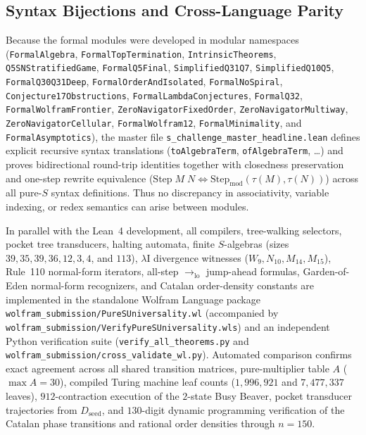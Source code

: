 \documentclass[11pt,reqno]{amsart}
\numberwithin{equation}{section}
\theoremstyle{plain}
\theoremstyle{definition}
\theoremstyle{remark}
\begin{document}
\subsection{Syntax Bijections and Cross-Language Parity}
\label{subsec:cross-language}

Because the formal modules were developed in modular namespaces (\texttt{FormalAlgebra}, \texttt{FormalTopTermination}, \texttt{IntrinsicTheorems}, \texttt{Q5SNStratifiedGame}, \texttt{FormalQ5Final}, \texttt{SimplifiedQ31Q7}, \texttt{SimplifiedQ10Q5}, \texttt{FormalQ30Q31Deep}, \texttt{FormalOrderAndIsolated}, \texttt{FormalNoSpiral}, \texttt{Conjecture17Obstructions}, \texttt{FormalLambdaConjectures}, \texttt{FormalQ32}, \texttt{FormalWolframFrontier}, \texttt{ZeroNavigatorFixedOrder}, \texttt{ZeroNavigatorMultiway}, \texttt{ZeroNavigatorCellular}, \texttt{FormalWolfram12}, \texttt{FormalMinimality}, and \texttt{FormalAsymptotics}), the master file \texttt{s\_challenge\_master\_headline.lean} defines explicit recursive syntax translations (\texttt{toAlgebraTerm}, \texttt{ofAlgebraTerm}, \dots) and proves bidirectional round-trip identities together with closedness preservation and one-step rewrite equivalence ($\mathrm{Step}\;M\;N \iff \mathrm{Step}_{\text{mod}}(\tau(M), \tau(N))$) across all pure-$S$ syntax definitions. Thus no discrepancy in associativity, variable indexing, or redex semantics can arise between modules.

In parallel with the Lean~4 development, all compilers, tree-walking selectors, pocket tree transducers, halting automata, finite $S$-algebras (sizes $39, 35, 39, 36, 12, 3, 4$, and $113$), $\lambda\mathrm{I}$ divergence witnesses ($W_9, N_{10}, M_{14}, M_{15}$), Rule~110 normal-form iterators, all-step $\to_{\mathrm{lo}}$ jump-ahead formulas, Garden-of-Eden normal-form recognizers, and Catalan order-density constants are implemented in the standalone Wolfram Language package \texttt{wolfram\_submission/PureSUniversality.wl} (accompanied by \texttt{wolfram\_submission/VerifyPureSUniversality.wls}) and an independent Python verification suite (\texttt{verify\_all\_theorems.py} and \texttt{wolfram\_submission/cross\_validate\_wl.py}). Automated comparison confirms exact agreement across all shared transition matrices, pure-multiplier table $A$ ($\max A = 30$), compiled Turing machine leaf counts ($1{,}996{,}921$ and $7{,}477{,}337$ leaves), $912$-contraction execution of the $2$-state Busy Beaver, pocket transducer trajectories from $D_{\mathrm{seed}}$, and $130$-digit dynamic programming verification of the Catalan phase transitions and rational order densities through $n = 150$.
\end{document}
